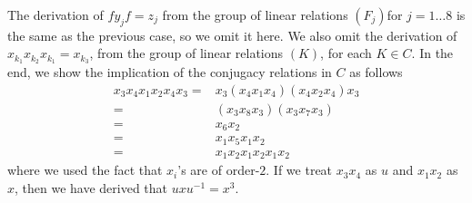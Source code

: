 The derivation of $fy_jf=z_j$ from the group of linear relations $(F_j)$for $j = 1 \dots 8$
is the same as the previous case, so we omit it here.
We also omit the derivation of $x_{k_1} x_{k_2} x_{k_1} = x_{k_3}$, 
from the group of linear relations $(K)$,
for each $K \in C$.
In the end, we show the implication of the conjugacy relations in $C$ as follows 
\begin{align*}
	x_3 x_4 x_1x_2 x_4 x_3 =& x_3 (x_4 x_1x_4) (x_4x_2 x_4) x_3 \\
	=& (x_3 x_8 x_3) (x_3 x_7 x_3)\\
	=& x_6 x_2\\
	=& x_1x_5x_1 x_2\\
	=&x_1x_2x_1x_2x_1x_2
\end{align*}
where we used the fact that $x_i$'s are of order-$2$.
If we treat $x_3x_4$ as $u$ and $x_1x_2$ as $x$, then we have derived that $uxu^{-1} = x^3$.

